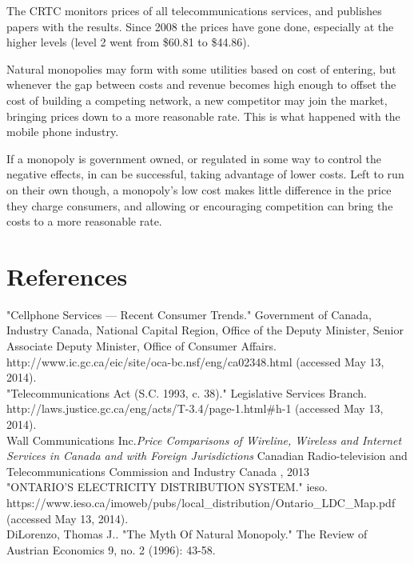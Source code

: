 \documentclass{article}
\begin{document}
The CRTC monitors prices of all telecommunications services, and publishes papers with the results. Since 2008 the prices have gone done, especially at the higher levels (level 2 went from \$60.81 to \$44.86).

Natural monopolies may form with some utilities based on cost of entering, but whenever the gap between costs and revenue becomes high enough to offset the cost of building a competing network, a new competitor may join the market, bringing prices down to a more reasonable rate. This is what happened with the mobile phone industry.

If a monopoly is government owned, or regulated in some way to control the negative effects, in can be successful, taking advantage of lower costs. Left to run on their own though, a monopoly's low cost makes little difference in the price they charge consumers, and allowing or encouraging competition can bring the costs to a more reasonable rate.

\section{References}

"Cellphone Services — Recent Consumer Trends." Government of Canada, Industry Canada, National Capital Region, Office of the Deputy Minister, Senior Associate Deputy Minister, Office of Consumer Affairs.\\ http://www.ic.gc.ca/eic/site/oca-bc.nsf/eng/ca02348.html (accessed May 13, 2014).\\

"Telecommunications Act (S.C. 1993, c. 38)." Legislative Services Branch. http://laws.justice.gc.ca/eng/acts/T-3.4/page-1.html\#h-1 (accessed May 13, 2014).\\

Wall Communications Inc.\textit{Price Comparisons of Wireline, Wireless and Internet Services in Canada and with Foreign Jurisdictions} Canadian Radio-television and Telecommunications Commission and Industry Canada , 2013\\

"ONTARIO’S ELECTRICITY DISTRIBUTION SYSTEM." ieso. 
 \\https://www.ieso.ca/imoweb/pubs/local\_distribution/Ontario\_LDC\_Map.pdf (accessed May 13, 2014).\\

DiLorenzo, Thomas J.. "The Myth Of Natural Monopoly." The Review of Austrian Economics 9, no. 2 (1996): 43-58.\\







%

%
\end{document}

